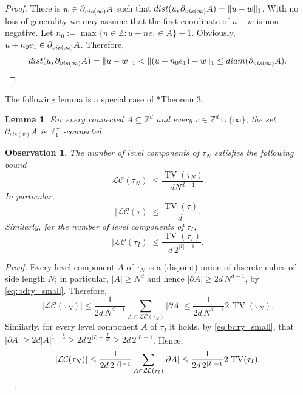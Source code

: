 \documentclass[11pt, reqno]{amsart}
\newtheorem{lemma}[theorem]{Lemma}
\newtheorem{obs}[theorem]{Observation}
\DeclareMathOperator{\TV}{TV}
\numberwithin{equation}{section}
\begin{document}
\begin{proof}
There is $w\in\partial_{{\rm vis}(\infty)}A$ such that
${\rm dist}(u,\partial_{{\rm vis}(\infty)}A)=\lVert u-w\rVert_1$. With no loss of generality we may assume that the first coordinate of $u-w$ is non-negative.
Let $n_0:=\max\{n\in{\mathbb Z}\colon u+ne_1\in A\}+1$. 
Obviously, $u+n_0e_1\in\partial_{{\rm vis}(\infty)}A$.
Therefore,
\begin{equation*}
{\rm dist}(u,\partial_{{\rm vis}(\infty)}A)=\lVert u-w\rVert_1<\lVert (u+n_0e_1)-w\rVert_1\leq{\rm diam}(\partial_{{\rm vis}(\infty)}A).
\qedhere
\end{equation*}
\end{proof}

The following lemma is a special case of \cite{T}*{Theorem 3}. 

\begin{lemma}\label{lem:Timar3}
For every connected $A\subseteq{\mathbb Z}^d$ and every $v\in{\mathbb Z}^d\cup\{\infty\}$, the set $\partial_{vis(v)}A$ is $\ell_1^+$-connected.  
\end{lemma}

\begin{obs}\label{obs:no_LC}
The number of level components of $\tau_N$ satisfies the following bound
\begin{equation*}
\lvert\mathcal{LC}(\tau_N)\rvert \leq\frac{\TV(\tau_N)}{d N^{d-1}}.
\end{equation*}
In particular, 
\begin{equation}\label{eq:no_LC}
\lvert\mathcal{LC}(\tau)\rvert \leq\frac{\TV(\tau)}{d}.
\end{equation}
Similarly, for the number of level components of $\tau_I$,
\begin{equation*}
|\mathcal{LC}(\tau_I)| \leq 
\frac{\TV(\tau_I)}{d \,2^{|I|-1}}.
\end{equation*}
\end{obs}

\begin{proof}
Every level component $A$ of $\tau_N$ is a (disjoint) union of discrete cubes of side length $N$; in particular, $\lvert A\rvert\geq N^d$ and hence $\lvert\partial A\rvert\geq 2d\, N^{d-1}$, by \eqref{eq:bdry_small}. Therefore,
$$
\lvert\mathcal{LC}(\tau_N)\rvert\leq\frac{1}{2d\,N^{d-1}}\sum_{A\in\mathcal{LC}(\tau_N)}\lvert\partial A\rvert\leq\frac{1}{2d\,N^{d-1}}2\,\TV(\tau_N).
$$
Similarly, for every level component $A$ of $\tau_I$ it holds, by \eqref{eq:bdry_small}, that $\lvert\partial A\rvert\geq 2d\lvert A\rvert^{1-\frac{1}{d}}\geq 2d\, 2^{\lvert I\rvert-\frac{\lvert I\rvert}{d}}\geq 2d\, 2^{\lvert I\rvert-1}$. Hence,
\begin{equation*}
\lvert\mathcal{LC}(\tau_N)\rvert\leq\frac{1}{2d\,2^{\lvert I\rvert-1}}\sum_{A\in\mathcal{LC}(\tau_I)}\lvert\partial A\rvert\leq\frac{1}{2d\,2^{\lvert I\rvert-1}}2\,\TV(\tau_I).
\qedhere\end{equation*}
\end{proof}
\end{document}

